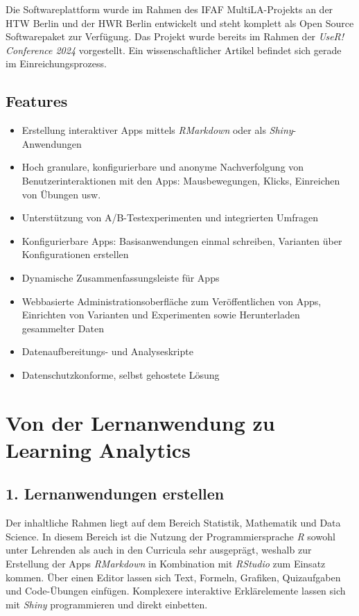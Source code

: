 \documentclass[a0,portrait]{a0poster}
\begin{document}
\begin{multicols}{2}
Die Softwareplattform wurde im Rahmen des IFAF MultiLA-Projekts an der HTW Berlin und der HWR Berlin entwickelt und steht komplett als Open Source Softwarepaket zur Verfügung. Das Projekt wurde bereits im Rahmen der \textit{UseR! Conference 2024} \cite{userconf24} vorgestellt. Ein wissenschaftlicher Artikel befindet sich gerade im Einreichungsprozess.

\subsection*{Features}

\begin{itemize}
    \item Erstellung interaktiver Apps mittels \textit{RMarkdown} oder als \textit{Shiny}-Anwendungen
    \item Hoch granulare, konfigurierbare und anonyme Nachverfolgung von Benutzerinteraktionen mit den Apps: Mausbewegungen, Klicks, Einreichen von Übungen usw.
    \item Unterstützung von A/B-Testexperimenten und integrierten Umfragen
    \item Konfigurierbare Apps: Basisanwendungen einmal schreiben, Varianten über Konfigurationen erstellen
    \item Dynamische Zusammenfassungsleiste für Apps
    \item Webbasierte Administrationsoberfläche zum Veröffentlichen von Apps, Einrichten von Varianten und Experimenten sowie Herunterladen gesammelter Daten
    \item Datenaufbereitungs- und Analyseskripte
    \item Datenschutzkonforme, selbst gehostete Lösung
\end{itemize}

\section*{Von der Lernanwendung zu Learning Analytics}

\subsection*{1. Lernanwendungen erstellen}

Der inhaltliche Rahmen liegt auf dem Bereich Statistik, Mathematik und Data Science. In diesem Bereich ist die Nutzung der Programmiersprache \textit{R} sowohl unter Lehrenden als auch in den Curricula sehr ausgeprägt, weshalb zur Erstellung der Apps \textit{RMarkdown} in Kombination mit \textit{RStudio} zum Einsatz kommen. Über einen Editor lassen sich Text, Formeln, Grafiken, Quizaufgaben und Code-Übungen einfügen. Komplexere interaktive Erklärelemente lassen sich mit \textit{Shiny} programmieren und direkt einbetten.


\end{multicols}
\end{document}
